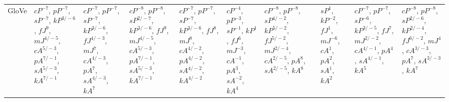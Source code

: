 \documentclass[letterpaper]{article} %
\begin{document}
\begin{sidewaystable*}
\begin{tabular}{l l l l l l l l l l l }
\multirow{10}{1.7cm}{GloVe} & \multirow{10}{1.7cm}{$cP^{-7}$, $pP^{-7}$, $sP^{-7}$, $kP^{3/-6}$, $fJ^{9}$, $mJ^{4/-5}$, $cA^{5/-3}$, $pA^{7/-1}$, $sA^{5/-3}$, $kA^{7/-1}$} & \multirow{10}{1.7cm}{$cP^{-7}$, $pP^{-7}$, $sP^{-7}$, $kP^{3/-6}$, $fJ^{4/-3}$, $mJ^{7}$, $cA^{4/-3}$, $pA^{7}$, $sA^{4/-3}$, $kA^{7}$} & \multirow{10}{1.7cm}{$cP^{-8}$, $pP^{-8}$, $sP^{2/-7}$, $kP^{3/-6}$, $fJ^{9}$, $mJ^{4/-5}$, $cA^{5/-3}$, $pA^{7/-1}$, $sA^{5/-3}$, $kA^{7/-1}$} & \multirow{10}{1.7cm}{$cP^{-7}$, $pP^{-7}$, $sP^{-7}$, $kP^{3/-6}$, $fJ^{8}$, $mJ^{8}$, $cA^{4/-2}$, $pA^{4/-2}$, $sA^{4/-2}$, $kA^{4/-2}$} & \multirow{10}{1.7cm}{$cP^{-4}$, $pP^{-3}$, $sP^{-1}$, $kP^{1}$, $fJ^{6}$, $mJ^{-3}$, $cA^{-1}$, $pA^{3}$, $sA^{-2}$, $kA^{4}$} & \multirow{10}{1.7cm}{$cP^{-8}$, $pP^{-8}$, $sP^{4/-2}$, $kP^{5/-2}$, $fJ^{5/-2}$, $mJ^{2/-4}$, $cA^{2/-5}$, $pA^{8}$, $sA^{2/-5}$, $kA^{8}$} & \multirow{10}{1.7cm}{} & \multirow{10}{1.7cm}{$sP^{1}$, $kP^{-2}$, $fJ^{1}$, $mJ^{-6}$, $cA^{1}$, $pA^{2}$, $sA^{1}$, $kA^{2}$} & \multirow{10}{1.7cm}{$cP^{-7}$, $pP^{-7}$, $sP^{-6}$, $kP^{3/-5}$, $fJ^{7}$, $mJ^{2/-2}$, $cA^{4/-1}$, $pA^{4}$, $sA^{4/-1}$, $kA^{5}$} & \multirow{10}{1.7cm}{$cP^{-8}$, $pP^{-8}$, $sP^{2/-6}$, $kP^{2/-4}$, $fJ^{6/-2}$, $mJ^{4}$, $cA^{3/-3}$, $pA^{7}$, $sA^{3/-3}$, $kA^{7}$} \\ \\ \\ \\ \\ \\ \\ \\ \\ \\
\midrule

\end{tabular}
\end{sidewaystable*}
\end{document}
